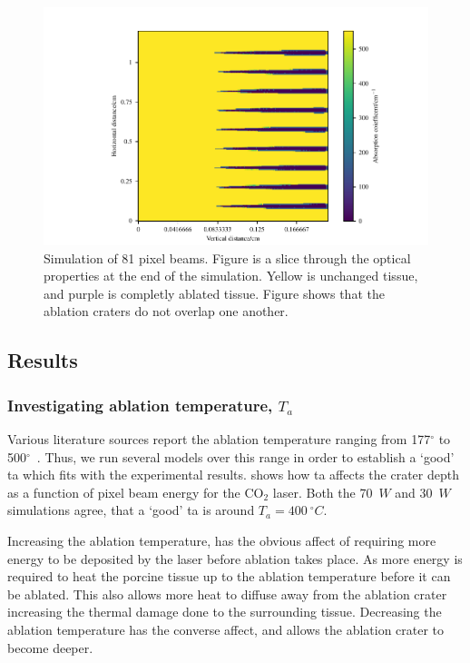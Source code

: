\begin{figure}
	\centering
    \includegraphics[width=\columnwidth]{./ablation/images/slice.pdf}
    \caption{Simulation of 81 pixel beams. Figure is a slice through the optical properties at the end of the simulation. Yellow is unchanged tissue, and purple is completly ablated tissue. Figure shows that the ablation craters do not overlap one another.}\label{fig:sizecheck}
\end{figure}

\subsection{Results}

\subsubsection{Investigating ablation temperature, \texorpdfstring{$T_a$}{Ta}}

Various literature sources report the ablation temperature ranging from 177$^{\circ}$ to 500$^{\circ}$~\cite{gerstmann1994char,mckenzie1986three,sagi1992heating}. Thus, we run several models over this range in order to establish a `good' \gls{ta} which fits with the experimental results.  shows how \gls{ta} affects the crater depth as a function of pixel beam energy for the CO$_2$ laser. Both the 70~$W$ and 30~$W$ simulations agree, that a `good' \gls{ta} is around $T_a=400~^{\circ}C$.

Increasing the ablation temperature, has the obvious affect of requiring more energy to be deposited by the laser before ablation takes place. As more energy is required to heat the porcine tissue up to the ablation temperature before it can be ablated. This also allows more heat to diffuse away from the ablation crater increasing the thermal damage done to the surrounding tissue. Decreasing the ablation temperature has the converse affect, and allows the ablation crater to become deeper.

